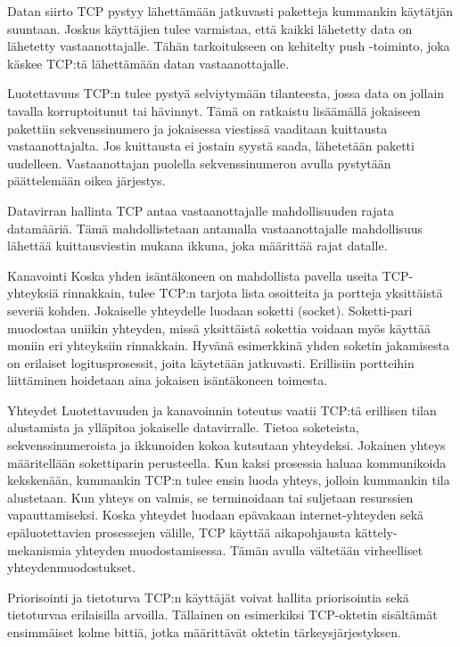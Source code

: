 \documentclass[utf8]{gradu3}
\begin{document}
\begin{desclist}
\item[Datan siirto] TCP pystyy lähettämään jatkuvasti paketteja kummankin käytätjän suuntaan. Joskus käyttäjien tulee varmistaa, että kaikki lähetetty data on lähetetty vastaanottajalle. Tähän tarkoitukseen on kehitelty push -toiminto, joka käskee TCP:tä
lähettämään datan vastaanottajalle.
\item[Luotettavuus] TCP:n tulee pystyä selviytymään tilanteesta, jossa data on jollain tavalla korruptoitunut tai hävinnyt. Tämä on ratkaistu lisäämällä jokaiseen pakettiin sekvenssinumero ja jokaisessa viestissä vaaditaan kuittausta vastaanottajalta. Jos kuittausta ei jostain syystä saada, lähetetään paketti uudelleen. Vastaanottajan puolella sekvenssinumeron avulla pystytään päättelemään oikea järjestys.
\item[Datavirran hallinta] TCP antaa vastaanottajalle mahdollisuuden rajata datamääriä. Tämä mahdollistetaan antamalla vastaanottajalle mahdollisuus lähettää kuittausviestin mukana ikkuna, joka määrittää rajat datalle.
\item[Kanavointi] Koska yhden isäntäkoneen on mahdollista pavella useita TCP-yhteyksiä rinnakkain, tulee TCP:n tarjota lista osoitteita ja portteja yksittäistä severiä kohden. Jokaiselle yhteydelle luodaan soketti (socket). Soketti-pari muodostaa uniikin yhteyden, missä yksittäistä sokettia voidaan myös käyttää moniin eri yhteyksiin rinnakkain. Hyvänä esimerkkinä yhden soketin jakamisesta on erilaiset logitusprosessit, joita käytetään jatkuvasti.  Erillisiin portteihin liittäminen hoidetaan aina jokaisen isäntäkoneen toimesta.
\item[Yhteydet] Luotettavuuden ja kanavoinnin toteutus vaatii TCP:tä erillisen tilan alustamista ja ylläpitoa jokaiselle datavirralle. Tietoa soketeista, sekvenssinumeroista ja ikkunoiden kokoa kutsutaan yhteydeksi. Jokainen yhteys määritellään sokettiparin perusteella. Kun kaksi prosessia haluaa kommunikoida kekskenään, kummankin TCP:n tulee ensin luoda yhteys, jolloin kummankin tila alustetaan. Kun yhteys on valmis, se terminoidaan tai suljetaan resurssien vapauttamiseksi. Koska yhteydet luodaan epävakaan internet-yhteyden sekä epäluotettavien prosessejen välille, TCP käyttää aikapohjausta kättely-mekanismia yhteyden muodostamisessa. Tämän avulla vältetään virheelliset yhteydenmuodostukset.
\item[Priorisointi ja tietoturva] TCP:n käyttäjät voivat hallita priorisointia sekä tietoturvaa erilaisilla arvoilla. Tällainen on esimerkiksi TCP-oktetin sisältämät ensimmäiset kolme bittiä, jotka määrittävät oktetin tärkeysjärjestyksen.
\end{desclist}
\end{document}
